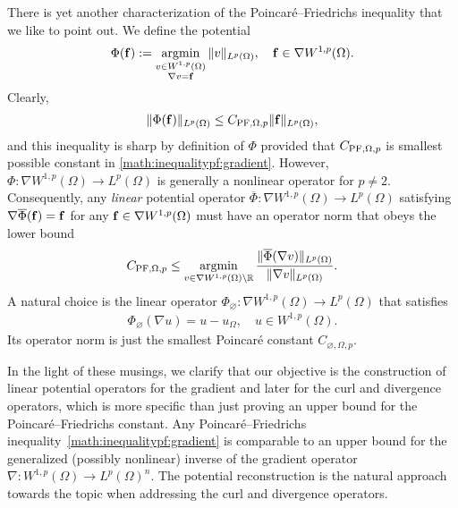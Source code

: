 \documentclass[a4paper]{article}
\begin{document}
There is yet another characterization of the Poincar\'e--Friedrichs inequality that we like to point out. 
We define the potential 
\begin{align*}
    \Phi( {\mathbf f} ) := \operatorname*{{\rm argmin}}\limits_{ \substack{ v \in W^{1,p}(\Omega) \\ \nabla v = {\mathbf f} } } \| v \|_{L^{p}(\Omega)},
    \quad 
    {\mathbf f} \in \nabla W^{1,p}(\Omega)
    .
\end{align*}
Clearly, 
\begin{align*}
    \| \Phi({\mathbf f}) \|_{L^p(\Omega)} \leq C_{{\rm PF},\Omega,p} \| {\mathbf f} \|_{L^p(\Omega)},
\end{align*}
and this inequality is sharp by definition of $\Phi$ provided that $C_{{\rm PF},\Omega,p}$ is smallest possible constant in \eqref{math:inequalitypf:gradient}. 
However, $\Phi : \nabla W^{1,p}(\Omega) \rightarrow L^p(\Omega)$ is generally a nonlinear operator for $p \neq 2$. 
Consequently, any \textit{linear} potential operator $\overline\Phi : \nabla W^{1,p}(\Omega) \rightarrow L^p(\Omega)$
satisfying $\nabla \overline\Phi( {\mathbf f} ) = {\mathbf f}$ for any ${\mathbf f} \in \nabla W^{1,p}(\Omega)$ must have an operator norm that obeys the lower bound 
\begin{align*}
    C_{{\rm PF},\Omega,p} 
    \leq 
    \operatorname*{{\rm argmin}}\limits_{ v \in \nabla W^{1,p}(\Omega) \setminus {\mathbb R} } 
    \frac{ \| \overline\Phi(\nabla v) \|_{L^p(\Omega)} }{ \| \nabla v \|_{L^p(\Omega)} }
    .
\end{align*}
A natural choice is the linear operator $\Phi_{\varnothing} : \nabla W^{1,p}(\Omega) \rightarrow L^p(\Omega)$ that satisfies 
\begin{align*}
    \Phi_{\varnothing}( \nabla u ) = u - u_{\Omega},
    \quad 
    u \in W^{1,p}(\Omega)
    .
\end{align*}
Its operator norm is just the smallest Poincar\'e constant $C_{\varnothing,\Omega,p}$.

In the light of these musings, we clarify that our objective is the construction of linear potential operators for the gradient and later for the curl and divergence operators,
which is more specific than just proving an upper bound for the Poincar\'e--Friedrichs constant. 
Any Poincar\'e--Friedrichs inequality~\eqref{math:inequalitypf:gradient} is comparable to an upper bound for the generalized (possibly nonlinear) inverse of the gradient operator $\nabla : W^{1,p}(\Omega) \rightarrow L^{p}(\Omega)^{n}$. 
The potential reconstruction is the natural approach towards the topic when addressing the curl and divergence operators. 
\end{document}

